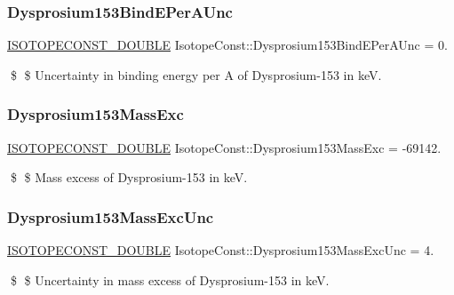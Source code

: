 \subsubsection{\texorpdfstring{Dysprosium153\+Bind\+E\+Per\+A\+Unc}{Dysprosium153BindEPerAUnc}}
{\footnotesize\ttfamily \mbox{\hyperlink{group___isotope_const-_macros_ga8f45a7272ce02c0b4c65c44636ed719a}{I\+S\+O\+T\+O\+P\+E\+C\+O\+N\+S\+T\+\_\+\+D\+O\+U\+B\+LE}} Isotope\+Const\+::\+Dysprosium153\+Bind\+E\+Per\+A\+Unc = 0.}

\$ \$ Uncertainty in binding energy per A of Dysprosium-\/153 in keV. \mbox{\label{group___isotope_const-_dysprosium-_dy153_ga09fe9ae43dac5b64030de60750e90c44}} 
\subsubsection{\texorpdfstring{Dysprosium153\+Mass\+Exc}{Dysprosium153MassExc}}
{\footnotesize\ttfamily \mbox{\hyperlink{group___isotope_const-_macros_ga8f45a7272ce02c0b4c65c44636ed719a}{I\+S\+O\+T\+O\+P\+E\+C\+O\+N\+S\+T\+\_\+\+D\+O\+U\+B\+LE}} Isotope\+Const\+::\+Dysprosium153\+Mass\+Exc = -\/69142.}

\$ \$ Mass excess of Dysprosium-\/153 in keV. \mbox{\label{group___isotope_const-_dysprosium-_dy153_gacfd6de0262410b73094d1413f9a9ab4b}} 
\subsubsection{\texorpdfstring{Dysprosium153\+Mass\+Exc\+Unc}{Dysprosium153MassExcUnc}}
{\footnotesize\ttfamily \mbox{\hyperlink{group___isotope_const-_macros_ga8f45a7272ce02c0b4c65c44636ed719a}{I\+S\+O\+T\+O\+P\+E\+C\+O\+N\+S\+T\+\_\+\+D\+O\+U\+B\+LE}} Isotope\+Const\+::\+Dysprosium153\+Mass\+Exc\+Unc = 4.}

\$ \$ Uncertainty in mass excess of Dysprosium-\/153 in keV. \mbox{\label{group___isotope_const-_dysprosium-_dy153_ga05fee44058cef3ff719af7a8934d6789}} 
